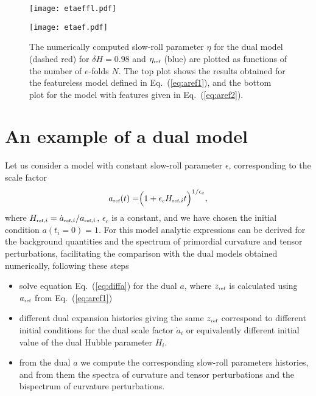 \documentclass[aps,prl,amsmath,nofootinbib,twocolumn]{revtex4}
\newcommand{\3}{\partial}
\newcommand{\4}{\frac}
\newcommand{\5}{\delta}
\renewcommand\({\left(}
\renewcommand\){\right)}
\renewcommand\[{\left[}
\renewcommand\]{\right]}
\newcommand{\be}{\begin{equation}}
\newcommand{\ee}{\end{equation}}
\newcommand{\reff}{{\mbox{\tiny ref}}}
\newcommand{\eqn}[1]{(\ref{#1})}
\begin{document}
\begin{figure}
 \begin{minipage}{.45\textwidth}
  \texttt{[image: etaeffl.pdf]}
  \end{minipage}
 \begin{minipage}{.45\textwidth}
  \texttt{[image: etaef.pdf]}
 \end{minipage}
  \caption{The numerically computed slow-roll parameter $\eta$ for the dual model (dashed red) for $\delta H=0.98$ and $\eta_\reff$ (blue) are plotted as functions of the number of $e$-folds $N$. The top plot shows the results obtained for the featureless model defined in Eq.~\eqn{eq:aref1}, and the bottom plot for the model with features given in Eq.~\eqn{eq:aref2}.
}
\label{fig:sreta}
\end{figure}

\section{An example of a dual model}\label{edm} %
Let us consider a model with constant slow-roll parameter $\epsilon$, corresponding to the scale factor
\be \label{eq:aref1}
a_{\reff}(t)= \Bigr(1+ \epsilon_{\mbox{\tiny c}} H_{\reff, i} t \Bigl)^{1/\epsilon_{\mbox{\tiny c}}},
\ee
where $H_{\reff, i}=\dot{a}_{\reff, i}/a_{\reff, i}$, $\epsilon_c$ is a constant, and we have chosen the initial condition $a(t_i=0)=1$. For this model analytic expressions can be derived  for the background quantities and the spectrum of primordial curvature and tensor perturbations, facilitating the comparison with the dual models obtained numerically, following these steps
\begin{itemize}
    \item solve equation Eq.~\eqn{eq:diffa} for the dual $a$, where $z_\reff$ is calculated using $a_\reff$ from Eq.~\eqn{eq:aref1}
    \item different dual expansion histories giving the same $z_\reff$ correspond to different initial conditions for the dual scale factor $\dot{a}_{i}$ or equivalently different initial value of the dual Hubble parameter $H_{i}$. 
    \item from the dual $a$ we compute the corresponding slow-roll parameters histories, and from them the spectra of curvature and tensor perturbations and the bispectrum of curvature perturbations.
\end{itemize}
\end{document}
